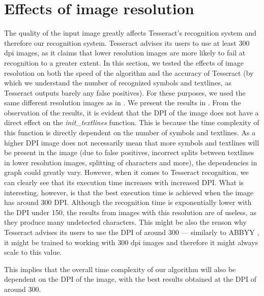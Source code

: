 \section{Effects of image resolution}

The quality of the input image greatly affects Tesseract's recognition system and therefore our recognition system. Tesseract advises its users to use at least 300 dpi images, as it claims that lower resolution images are more likely to fail at recognition to a greater extent. In this section, we tested the effects of image resolution on both the speed of the algorithm and the accuracy of Tesseract (by which we understand the number of recognized symbols and textlines, as Tesseract outputs barely any false positives). For these purposes, we used the same different resolution images as in . We present the results in . From the observation of the results, it is evident that the DPI of the image does not have a direct effect on the \emph{init\_textlines} function. This is because the time complexity of this function is directly dependent on the number of symbols and textlines. As a higher DPI image does not necessarily mean that more symbols and textlines will be present in the image (due to false positives, incorrect splits between textlines in lower resolution images, splitting of characters and more), the dependencies in graph  could greatly vary. However, when it comes to Tesseract recognition, we can clearly see  that its execution time increases with increased DPI. What is interesting, however, is that the best execution time is achieved when the image has around 300 DPI. Although the recognition time is exponentially lower with the DPI under 150, the results from images with this resolution are of useless, as they produce many undetected characters. This might be also the reason why Tesseract advises its users to use the DPI of around 300 --- similarly to ABBYY , it might be trained to working with 300 dpi images and therefore it might always scale to this value.

This implies that the overall time complexity of our algorithm will also be dependent on the DPI of the image, with the best results obtained at the DPI of around 300.

